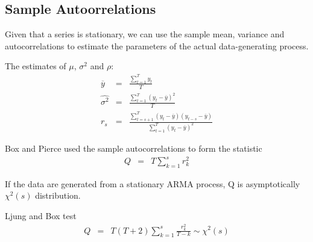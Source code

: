 \subsection{Sample Autoorrelations}
Given that a series is stationary, we can use the sample mean, variance and autocorrelations to estimate the parameters of the actual data-generating process.

The estimates of $\mu$, $\sigma^{2}$ and $\rho$:
\begin{eqnarray*}
\overline{y}&=&\frac{\sum_{t=1}^{T}y_{t}}{T}\\
\hat{\sigma^{2}}&=&\frac{\sum_{t=1}^{T}(y_{t}-\overline{y})^{2}}{T}\\
r_{s}&=&\frac{\sum_{t=s+1}^{T}(y_{t}-\overline{y})(y_{t-s}-\overline{y})}{\sum_{t=1}^{T}(y_{t}-\overline{y})^{2}}
\end{eqnarray*}

Box and Pierce used the sample autocorrelations to form the statistic
\begin{eqnarray*}
Q&=&T\sum_{k=1}^{s}r_{k}^{2}
\end{eqnarray*}

If the data are generated from a stationary ARMA process, Q is asymptotically $\chi^{2}(s)$ distribution. 

Ljung and Box test
\begin{eqnarray*}
Q&=&T(T+2)\sum_{k=1}^{s}\frac{r_{k}^{2}}{T-k} \sim \chi^{2}(s)
\end{eqnarray*}